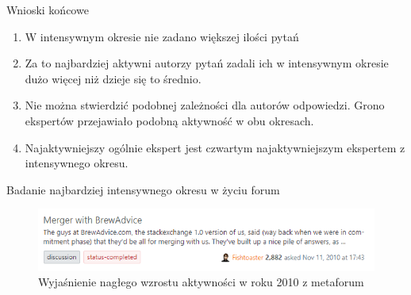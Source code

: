 \documentclass[./main.tex]{subfiles}
\begin{document}
\begin{frame}{Wnioski końcowe}
    \begin{enumerate}
        \item W intensywnym okresie nie zadano większej ilości pytań
        \item Za to najbardziej aktywni autorzy pytań zadali ich w intensywnym okresie dużo więcej niż dzieje się to średnio.
        \item Nie można stwierdzić podobnej zależności dla autorów odpowiedzi. Grono ekspertów przejawiało podobną aktywność w obu okresach.
        \item Najaktywniejszy ogólnie ekspert jest czwartym najaktywniejszym ekspertem z intensywnego okresu.
    \end{enumerate}
\end{frame}


\begin{frame}{Badanie najbardziej intensywnego okresu w życiu forum}
   \begin{figure}[t]
        \includegraphics[width=\textwidth]{homebrewing/meta.png}
        \caption*{Wyjaśnienie nagłego wzrostu aktywności w roku 2010 z metaforum}
    \end{figure}
\end{frame}
\end{document}
